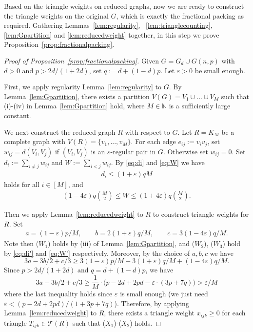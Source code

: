 \documentclass[11pt,reqno]{amsart}
\theoremstyle{definition}
\theoremstyle{remark}
\newcommand\dT{\mathcal{T}}
\renewcommand\leq{\leqslant}
\renewcommand\geq{\geqslant}
\renewcommand\le{\leqslant}
\begin{document}
Based on the triangle weights on reduced graphs, now we are ready to construct the triangle weights on the original $G$, which is exactly the fractional packing as required. Gathering Lemmas~\ref{lem:regularity}, ~\ref{lem:trianglecounting}, \ref{lem:Gpartition} and \ref{lem:reducedweight} together, in this step we prove Proposition~\ref{prop:fractionalpacking}.

\begin{proof}[Proof of Proposition~\ref{prop:fractionalpacking}]
Given $G=G_d\cup G(n,p)$ with $d>0$ and $p>2d/(1+2d)$, set $q:=d+(1-d)p$. Let $\varepsilon>0$ be small enough. 

First, we apply regularity Lemma~\ref{lem:regularity} to $G$. By Lemma~\ref{lem:Gpartition}, there exists a partition $V(G)=V_1\cup...\cup V_M$ such that (i)-(iv) in Lemma~\ref{lem:Gpartition} hold, where $M\in\mathbb{N}$ is a sufficiently large constant. 

We next construct the reduced graph $R$ with respect to $G$. Let $R=K_M$ be a complete graph with $V(R)=\{v_1,...,v_M\}$. For each edge $e_{ij}:=v_iv_j$, set
$w_{ij}= d(V_i,V_j)$ if $(V_i,V_j)$ is an $\varepsilon$-regular pair in $G$. Otherwise set $w_{ij}=0$. Set $d_i:=\sum_{i\neq j}w_{ij}$ and $ W:=\sum_{i<j} w_{ij}$. By \eqref{eq:di} and \eqref{eq:W} we have
\begin{align}\label{eq:di'}
d_i\leq (1+\varepsilon)qM
\end{align}
holds for all $i\in [M]$, and
\begin{align}\label{eq:W'}
(1-4\varepsilon)q\binom{M}{2}\le W\le
(1+4\varepsilon)q\binom{M}{2}.   
\end{align}

Then we apply Lemma~\ref{lem:reducedweight} to $R$ to construct triangle weights for $R$. Set 
\begin{align*}
a=(1-\varepsilon)p/M,\qquad b=2(1+\varepsilon)q/M,\qquad c=3(1-4\varepsilon)q/M.   
\end{align*}
Note then ($W_1$) holds by (iii) of Lemma~\ref{lem:Gpartition}, and ($W_2$), ($W_3$) hold by \eqref{eq:di'} and \eqref{eq:W'} respectively. Moreover, by the choice of $a,b,c$ we have 
$$3a-3b/2+c/3\geq 3(1-\varepsilon)p/M - 3(1+\varepsilon)q/M + (1-4\varepsilon)q/M.$$
Since $p>2d/(1+2d)$ and $q=d+(1-d)p$, we have
$$3a-3b/2+c/3\geq \frac{1}{M}\cdot \Big(p-2d+2pd-\varepsilon\cdot(3p+7q)\Big)>\varepsilon/M$$
where the last inequality holds since $\varepsilon$ is small enough (we just need $\varepsilon<(p-2d+2pd)/(1+3p+7q)$). Therefore, by applying Lemma~\ref{lem:reducedweight} to $R$, there exists a triangle weight $x_{ijk}\geq 0$ for each triangle $T_{ijk}\in\dT(R)$ such that ($X_1$)-($X_2$) holds.  


\end{proof}
\end{document}
